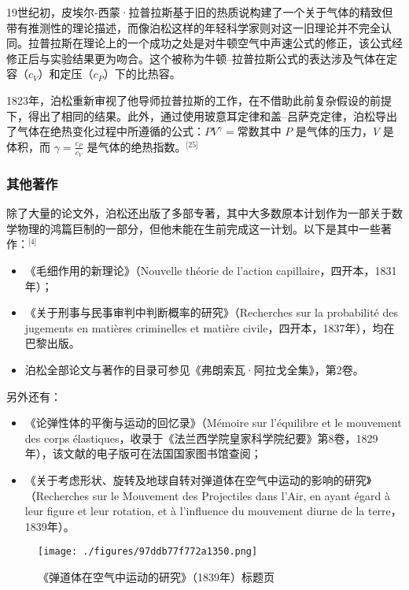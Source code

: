 19世纪初，皮埃尔-西蒙·拉普拉斯基于旧的热质说构建了一个关于气体的精致但带有推测性的理论描述，而像泊松这样的年轻科学家则对这一旧理论并不完全认同。拉普拉斯在理论上的一个成功之处是对牛顿空气中声速公式的修正，该公式经修正后与实验结果更为吻合。这个被称为牛顿–拉普拉斯公式的表达涉及气体在定容（$c_V$）和定压（$c_P$）下的比热容。

1823年，泊松重新审视了他导师拉普拉斯的工作，在不借助此前复杂假设的前提下，得出了相同的结果。此外，通过使用玻意耳定律和盖–吕萨克定律，泊松导出了气体在绝热变化过程中所遵循的公式：$PV^\gamma = \text{常数}$其中 $P$ 是气体的压力，$V$ 是体积，而 $\gamma = \frac{c_P}{c_V}$ 是气体的绝热指数。\(^\text{[25]}\)
\subsubsection{其他著作}
除了大量的论文外，泊松还出版了多部专著，其中大多数原本计划作为一部关于数学物理的鸿篇巨制的一部分，但他未能在生前完成这一计划。以下是其中一些著作：\(^\text{[4]}\)
\begin{itemize}
\item 《毛细作用的新理论》（Nouvelle théorie de l'action capillaire，四开本，1831年）；
\item 《关于刑事与民事审判中判断概率的研究》（Recherches sur la probabilité des jugements en matières criminelles et matière civile，四开本，1837年），均在巴黎出版。
\item 泊松全部论文与著作的目录可参见《弗朗索瓦·阿拉戈全集》，第2卷。
\end{itemize}
另外还有：
\begin{itemize}
\item 《论弹性体的平衡与运动的回忆录》（Mémoire sur l'équilibre et le mouvement des corps élastiques，收录于《法兰西学院皇家科学院纪要》第8卷，1829年），该文献的电子版可在法国国家图书馆查阅；
\item 《关于考虑形状、旋转及地球自转对弹道体在空气中运动的影响的研究》（Recherches sur le Mouvement des Projectiles dans l'Air, en ayant égard à leur figure et leur rotation, et à l'influence du mouvement diurne de la terre，1839年）。
\end{itemize}
\begin{figure}[ht]
\centering
\texttt{[image: ./figures/97ddb77f772a1350.png]}
\caption{《弹道体在空气中运动的研究》（1839年）标题页} \label{fig_BSDN_4}
\end{figure}